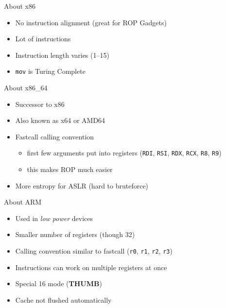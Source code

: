 \documentclass[beamer]{uibk}
\begin{document}
\begin{frame}{About x86}
    \begin{itemize}
        \item No instruction alignment (great for ROP Gadgets)
        \item Lot of instructions
        \item Instruction length varies (\SIrange{1}{15}{\byte})
        \item \texttt{mov} is Turing Complete
    \end{itemize}
\end{frame}

\begin{frame}{About x86\_64}
    \begin{itemize}
        \item Successor to x86
        \item Also known as x64 or AMD64
        \item Fastcall calling convention
            \begin{itemize}
                \item first few arguments put into registers (\texttt{RDI},
                    \texttt{RSI}, \texttt{RDX}, \texttt{RCX}, \texttt{R8},
                    \texttt{R9})
                \item this makes ROP much easier
            \end{itemize}
        \item More entropy for ASLR (hard to bruteforce)
    \end{itemize}
\end{frame}

\begin{frame}{About ARM}
    \begin{itemize}
        \item Used in \emph{low power} devices
        \item Smaller number of registers (though \SI{32}{\bit})
        \item Calling convention similar to fastcall (\texttt{r0}, \texttt{r1},
            \texttt{r2}, \texttt{r3})
        \item Instructions can work on multiple registers at once
        \item Special \SI{16}{\bit} mode (\textbf{THUMB})
        \item Cache not flushed automatically
    \end{itemize}
\end{frame}
\end{document}
